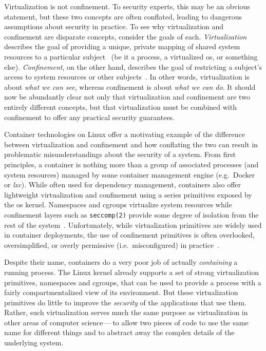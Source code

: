 Virtualization is not confinement. To security experts, this may be an obvious statement,
but these two concepts are often conflated, leading to dangerous assumptions about
security in practice. To see why virtualization and confinement are disparate concepts,
consider the goals of each. \textit{Virtualization} describes the goal of providing
a unique, private mapping of shared system resources to a particular subject~
(be it a process, a virtualized \gls{os}, or something else).
\textit{Confinement}, on the other hand, describes the goal of restricting a subject's
access to system resources or other subjects~. In other words, virtualization
is about \textit{what we can see}, whereas confinement is about \textit{what we can do}.
It should now be abundantly clear not only that virtualization and confinement are two
entirely different concepts, but that virtualization must be combined with confinement to
offer any practical security guarantees.

Container technologies on Linux offer a motivating example of the difference between
virtualization and confinement and how conflating the two can result in problematic
misunderstandings about the security of a system. From first principles, a container is
nothing more than a group of associated processes (and system resources) managed by some
container management engine (e.g.~Docker or \textit{lxc}). While often used for dependency
management, containers also offer lightweight virtualization and confinement using
a series primitives exposed by the \gls{os} kernel. Namespaces and cgroups
virtualize system resources while confinement layers such as \texttt{seccomp(2)} provide
some degree of isolation from the rest of the system~. Unfortunately, while
virtualization primitives are widely used in container deployments, the use of confinement
primitives is often overlooked, oversimplified, or overly permissive (i.e.~misconfigured)
in practice~.

Despite their name, containers do a very poor job of actually \textit{containing}
a running process.  The Linux kernel already supports a set of strong virtualization
primitives, namespaces and cgroups, that can be used to provide a process with a fairly
compartmentalized view of its environment. But these virtualization primitives do little
to improve the \textit{security} of the applications that use them. Rather, such
virtualization serves much the same purpose as virtualization in other areas of computer
science\,---\,to allow two pieces of code to use the same name for different things and to
abstract away the complex details of the underlying system.

